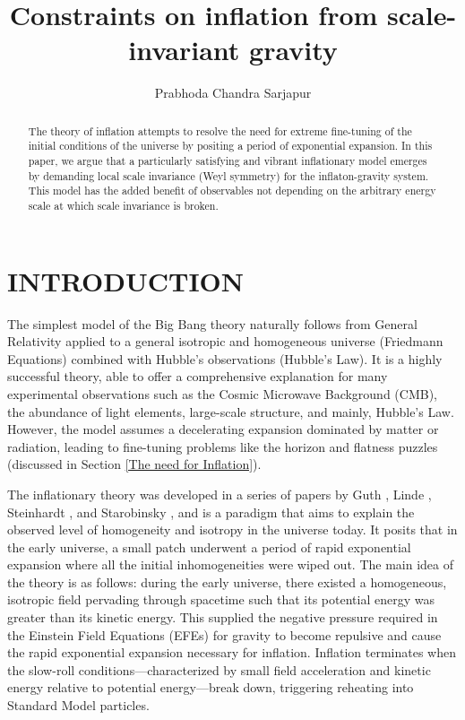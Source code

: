 \documentclass[aps,prd,reprint,preprintnumbers,showpacs,floatfix,nofootinbib,superscript address]{revtex4-2}
\begin{document}
\title{Constraints on inflation from scale-invariant gravity}

\author{Prabhoda Chandra Sarjapur}

\begin{abstract}
The theory of inflation attempts to resolve the need for extreme fine-tuning of the initial conditions of the universe by positing a period of exponential expansion. In this paper, we argue that a particularly satisfying and vibrant inflationary model emerges by demanding local scale invariance (Weyl symmetry) for the inflaton-gravity system. This model has the added benefit of observables not depending on the arbitrary energy scale at which scale invariance is broken.
\end{abstract}

\maketitle
\section{INTRODUCTION} \label{Introduction}

\indent The simplest model of the Big Bang theory naturally follows from General Relativity applied to a general isotropic and homogeneous universe (Friedmann Equations) combined with Hubble's observations (Hubble's Law).  It is a highly successful theory, able to offer a comprehensive explanation for many experimental observations such as the Cosmic Microwave Background (CMB), the abundance of light elements, large-scale structure, and mainly, Hubble's Law. However, the model assumes a decelerating expansion dominated by matter or radiation, leading to fine-tuning problems like the horizon and flatness puzzles (discussed in Section \ref{The need for Inflation}).


The inflationary theory was developed in a series of papers by Guth \cite{GuthOriginalPaper}, Linde \cite{LINDE1982389}, Steinhardt 
\cite{PhysRevLett.48.1220}, and Starobinsky \cite{STAROBINSKY198099}, and is a paradigm that aims to explain the observed level of homogeneity and isotropy in the universe today. It posits that in the early universe, a small patch underwent a period of rapid exponential expansion where all the initial inhomogeneities were wiped out. The main idea of the theory is as follows: during the early universe, there existed a homogeneous, isotropic field pervading through spacetime such that its potential energy was greater than its kinetic energy. This supplied the negative pressure required in the Einstein Field Equations (EFEs) for gravity to become repulsive and cause the rapid exponential expansion necessary for inflation. Inflation terminates when the slow-roll conditions—characterized by small field acceleration and kinetic energy relative to potential energy—break down, triggering reheating into Standard Model particles.
\end{document}

